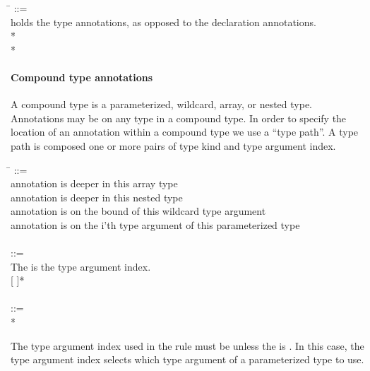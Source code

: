 \documentclass{article}
\begin{document}
\begin{tabbing}
\qquad \= \kill
{} ::= \\
\qquad    \bnfcmt holds the type annotations, as opposed to the declaration annotations. \\
\qquad        {} * \lineend \\
\qquad        {}*
\end{tabbing}


\paragraph{Compound type annotations}

A compound type is a parameterized, wildcard, array, or nested type. Annotations
may be on any type in a compound type. In order to specify the location of an
annotation within a compound type we use a ``type path''. A
type path is composed one or more pairs of type kind and type argument index.

\begin{tabbing}
\qquad \= \kill
{} ::= \\
\qquad    {} \bnfcmt annotation is deeper in this array type \\
\qquad    \bnfor{}  \bnfcmt annotation is deeper in this nested type \\
\qquad    \bnfor{}  \bnfcmt annotation is on the bound of this wildcard type argument \\
\qquad    \bnfor{}  \bnfcmt annotation is on the i'th type argument of this parameterized type \\
\\
 ::= \\
\qquad    \bnfcmt The  is the type argument index. \\
\qquad    {} \bnflit{,}  [ \bnflit{,}  \bnflit{,}  ]* \\
\\
 ::= \\
\qquad    {}  \bnflit{:} * \lineend
\end{tabbing}

\noindent
The type argument index used in the  rule must be  unless the  is
. In this case, the type argument index selects which type argument
of a parameterized type to use.
\end{document}
